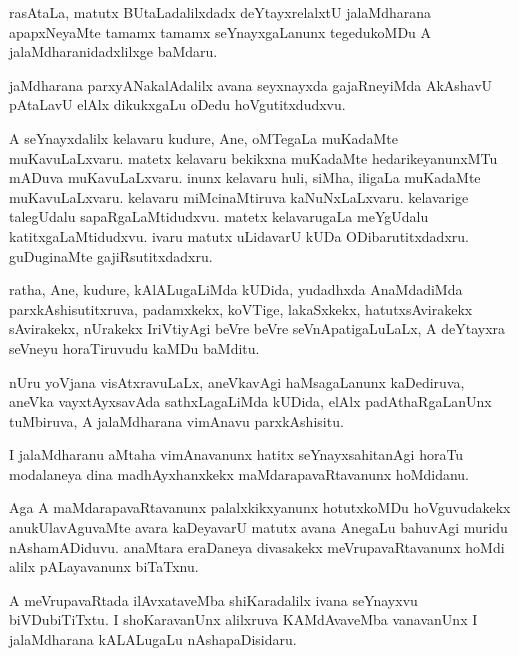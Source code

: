 \documentclass{article}
\begin{document}
\begin{mn}%
rasAtaLa, matutx BUtaLadalilxdadx deYtayxrelalxtU jalaMdharana apapxNeyaMte tamamx tamamx 
seYnayxgaLanunx tegedukoMDu A jalaMdharanidadxlilxge baMdaru.
\end{mn}

\begin{mn}%
jaMdharana parxyANakalAdalilx avana seyxnayxda gajaRneyiMda AkAshavU pAtaLavU elAlx 
dikukxgaLu oDedu hoVgutitxdudxvu.
\end{mn}

\begin{mn}%
A seYnayxdalilx kelavaru kudure, Ane, oMTegaLa muKadaMte muKavuLaLxvaru. matetx kelavaru 
bekikxna muKadaMte hedarikeyanunxMTu mADuva muKavuLaLxvaru. inunx kelavaru huli, siMha, 
iligaLa muKadaMte muKavuLaLxvaru. kelavaru miMcinaMtiruva kaNuNxLaLxvaru. kelavarige 
talegUdalu sapaRgaLaMtidudxvu. matetx kelavarugaLa meYgUdalu katitxgaLaMtidudxvu. ivaru 
matutx uLidavarU kUDa ODibarutitxdadxru. guDuginaMte gajiRsutitxdadxru.
\end{mn}

\begin{mn}%
ratha, Ane, kudure, kAlALugaLiMda kUDida, yudadhxda AnaMdadiMda parxkAshisutitxruva, 
padamxkekx, koVTige, lakaSxkekx, hatutxsAvirakekx sAvirakekx, nUrakekx IriVtiyAgi beVre 
beVre seVnApatigaLuLaLx, A deYtayxra seVneyu horaTiruvudu kaMDu baMditu.
\end{mn}

\begin{mn}%
nUru yoVjana visAtxravuLaLx, aneVkavAgi haMsagaLanunx kaDediruva, aneVka vayxtAyxsavAda 
sathxLagaLiMda kUDida, elAlx padAthaRgaLanUnx tuMbiruva, A jalaMdharana vimAnavu 
parxkAshisitu.
\end{mn}

\begin{mn}%
I jalaMdharanu aMtaha vimAnavanunx hatitx seYnayxsahitanAgi horaTu modalaneya dina 
madhAyxhanxkekx maMdarapavaRtavanunx hoMdidanu. 
\end{mn}

\begin{mn}%
Aga A maMdarapavaRtavanunx palalxkikxyanunx hotutxkoMDu hoVguvudakekx anukUlavAguvaMte avara 
kaDeyavarU matutx avana AnegaLu bahuvAgi muridu nAshamADiduvu. anaMtara eraDaneya 
divasakekx meVrupavaRtavanunx hoMdi alilx pALayavanunx biTaTxnu.
\end{mn}

\begin{mn}%
A meVrupavaRtada ilAvxataveMba shiKaradalilx ivana seYnayxvu biVDubiTiTxtu. I shoKaravanUnx 
alilxruva KAMdAvaveMba vanavanUnx I jalaMdharana kALALugaLu nAshapaDisidaru.
\end{mn}
\end{document}
